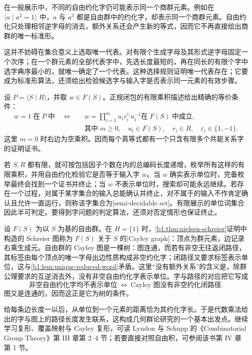 \ProseParagraphBreak
在一般展示中，不同的自由约化字仍可能表示同一个商群元素。例如在 \(\langle a\mid a^2=1\rangle\) 中，\(a\) 与 \(a^3\) 都是自由群中的约化字，却表示同一个商群元素。自由约化只处理相邻逆字母的消去，额外关系还会产生新的等式，因而它不再直接给出商群的唯一标准形。

\ProseParagraphBreak
这并不妨碍在集合意义上选取唯一代表。对有限个生成字母及其形式逆字母固定一个次序；在一个群元素的全部代表字中，先选长度最短的，再在同长的有限个字中选字典序最小的，就唯一确定了一个代表。这种选择规则证明唯一代表存在；它要成为标准形算法，还须给出检验候选字与输入字是否表示同一元素的有效步骤。

\ProseParagraphBreak
设 \(P=\langle S\mid R\rangle\)，并取 \(w\in F(S)\)。正规闭包的有限乘积描述给出精确的等价条件：
\[
	\begin{aligned}
		w=1\;\text{在}\;P\;\text{中} \quad\Longleftrightarrow\quad &w=\prod_{i=1}^{m}u_i r_i^{\varepsilon_i}u_i^{-1} \text{在}\;F(S)\;\text{中成立},\\
		&\text{其中}\;m\ge0,\quad u_i\in F(S),\quad r_i\in R,\quad \varepsilon_i\in\{1,-1\}.
	\end{aligned}
\]
这里 \(m=0\) 时右边为空乘积。因而每个真等式都有一个只含有限多个共轭关系字的证明证书。

\ProseParagraphBreak
若 \(S,R\) 都有限，就可按包括因子个数在内的总编码长度递增，枚举所有这样的有限乘积，并用自由约化检验它是否等于输入字 \(w\)。当 \(w\) 确实表示单位时，完备枚举最终会找到一个证书并终止；当 \(w\) 不表示单位时，搜索却可能永远继续。若存在一个过程，对属于某字集合的输入总能确认并终止，对不属于的输入不作肯定确认且允许一直运行，则称该字集合为[semi-decidable set]。有限展示的单位词集合因此半可判定。要得到字问题的判定算法，还须对否定情形也保证终止。

\ProseParagraphBreak
设 \(F(S)\) 为以 \(S\) 为基的自由群。在 \(H=\{1\}\) 时，\cref{b1:thm:nielsen-schreier}证明中构造的 Schreier 图称为 \(F(S)\) 关于 \(S\) 的[Cayley graph]：顶点为群元素，边记录右乘生成元。自由群的 Cayley 图是一棵树：图连通，而若有非空无往返闭路径，其标签由每个顶点的唯一字母出边性质构成非空约化字；闭路径又要求标签表示单位，这与\cref{b1:lem:unique-reduced-word}矛盾。这里“没有额外关系”的含义是，除群公理要求的互逆消去外，没有非空自由约化字表示单位。字与路径的对应把它写成
\[
	\text{非空自由约化字均不表示单位} \ \Longleftrightarrow\
	\text{Cayley 图没有非空约化闭路径}.
\]
图又是连通的，因而这正是它为树的条件。

\ProseParagraphBreak
给每条边长度一以后，从单位到一个元素的距离恰为其约化字长。于是代数乘法给出的字与图上的路径长度发生联系，这构成几何群论研究的一个基本出发点。继续学习复形、覆盖映射与 Cayley 复形，可读 Lyndon 与 Schupp 的《Combinatorial Group Theory》第 III 章第 2--4 节\cite[Chapter III, \S\S~2--4, pp. 115--124]{LyndonSchupp2001}；若要直接对照自由积，可参阅该书第 IV 章第 1 节\cite[Chapter IV, \S~1]{LyndonSchupp2001}。
